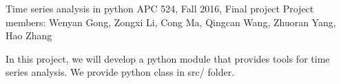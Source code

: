 



Time series analysis in python A\+PC 524, Fall 2016, Final project Project members\+: Wenyan Gong, Zongxi Li, Cong Ma, Qingcan Wang, Zhuoran Yang, Hao Zhang





In this project, we will develop a python module that provides tools for time series analysis. We provide python class in src/ folder. 
